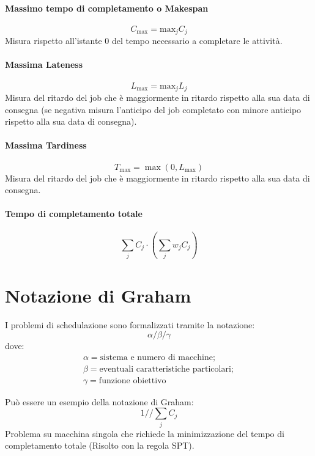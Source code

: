 %
\paragraph{Massimo tempo di completamento o Makespan}
\[
    C_{\max} = \text{max}_{j}C_{j}
\]
Misura rispetto all'istante $ 0 $ del tempo necessario a completare le attività.

%
\paragraph{Massima Lateness}
\[
    L_{\max} = \text{max}_{j}L_{j}
\]
Misura del ritardo del job che è maggiormente in ritardo rispetto alla sua data di consegna (se negativa misura l'anticipo del job completato con minore anticipo rispetto alla sua data di consegna).

%
\paragraph{Massima Tardiness}
\[
    T_{\max} = \max(0,L_{\max})
\]
Misura del ritardo del job che è maggiormente in ritardo rispetto alla sua data di consegna.

%
\paragraph{Tempo di completamento totale}
\[
    \textstyle\sum_{j}C_{j} \cdot (\textstyle\sum _{j}w_{j}C_{j})
\]


%
\section{Notazione di Graham}
I problemi di schedulazione sono formalizzati tramite la notazione:
\[
    \alpha / \beta / \gamma
\]
dove:
\begin{gather*}
    \alpha = \text{sistema e numero di macchine}; \\
    \beta = \text{eventuali caratteristiche particolari}; \\
    \gamma = \text{funzione obiettivo}
\end{gather*}

\begin{example}
    Può essere un esempio della notazione di Graham:
    \[
        1 / / \textstyle \sum_{j}C_{j}
    \]
    Problema su macchina singola che richiede la minimizzazione del tempo di completamento totale (Risolto con la regola SPT).
\end{example}

